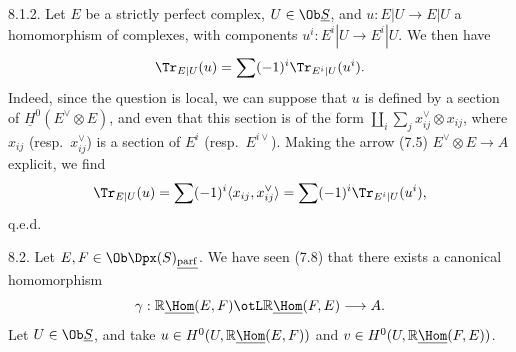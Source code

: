 8.1.2. Let \(E\) be a strictly perfect complex, \(U\in\Ob \underline{S}\), and \(u:E|U\longrightarrow E|U\) a homomorphism of complexes, with components \(u^i:E^i|U\to E^i|U\). We then have
\[
  \Tr_{E|U}(u)=\sum(-1)^i\Tr_{E^i|U}(u^i).
\]
Indeed, since the question is local, we can suppose that \(u\) is defined by a section of \(\underline{H}^0(E^\vee\otimes E)\), and even that this section is of the form \(\coprod_i\sum_j x_{ij}^\vee\otimes x_{ij}\), where \(x_{ij}\) (resp.\ \(x_{ij}^\vee\)) is a section of \(E^i\) (resp.\ \(E^{i\vee}\)). Making the arrow (7.5) \(E^\vee\otimes E\to A\) explicit, we find
\[
  \Tr_{E|U}(u)=\sum(-1)^i\langle x_{ij},x_{ij}^\vee\rangle
  =\sum(-1)^i\Tr_{E^i|U}(u^i),
\]
q.e.d.

8.2. Let \(E,F\in\Ob\Dpx(S)_{\underline{\mathrm{parf}}}\). We have seen (7.8) that there exists a canonical homomorphism
\[
  \gamma:\mathbb{R}\underline{\Hom}(E,F)\otL\mathbb{R}\underline{\Hom}(F,E)\longrightarrow A.
\]
Let \(U\in\Ob \underline{S}\), and take \(u\in H^0(U,\mathbb{R}\underline{\Hom}(E,F))\) and \(v\in H^0(U,\mathbb{R}\underline{\Hom}(F,E))\).

